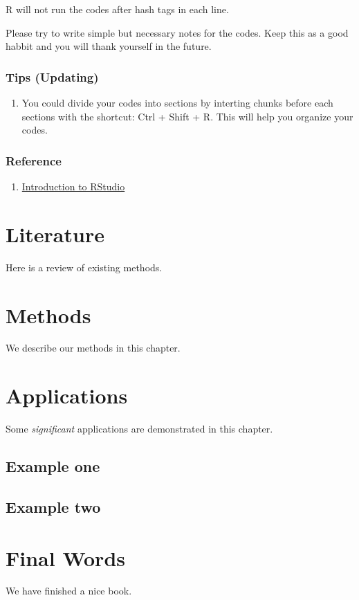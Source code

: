 \documentclass[]{book}
\providecommand{\tightlist}{%
  \setlength{\itemsep}{0pt}\setlength{\parskip}{0pt}}
\begin{document}
R will not run the codes after hash tags in each line.

Please try to write simple but necessary notes for the codes. Keep this as a good habbit and you will thank yourself in the future.

\hypertarget{tips-updating}{%
\subsection{Tips (Updating)}\label{tips-updating}}

\begin{enumerate}
\def\labelenumi{\arabic{enumi}.}
\tightlist
\item
  You could divide your codes into sections by interting chunks before each sections with the shortcut: Ctrl + Shift + R. This will help you organize your codes.
\end{enumerate}

\hypertarget{reference}{%
\subsection{Reference}\label{reference}}

\begin{enumerate}
\def\labelenumi{\arabic{enumi}.}
\tightlist
\item
  \href{https://datascienceplus.com/introduction-to-rstudio/}{Introduction to RStudio}
\end{enumerate}

\hypertarget{literature}{%
\chapter{Literature}\label{literature}}

Here is a review of existing methods.

\hypertarget{methods}{%
\chapter{Methods}\label{methods}}

We describe our methods in this chapter.

\hypertarget{applications}{%
\chapter{Applications}\label{applications}}

Some \emph{significant} applications are demonstrated in this chapter.

\hypertarget{example-one}{%
\section{Example one}\label{example-one}}

\hypertarget{example-two}{%
\section{Example two}\label{example-two}}

\hypertarget{final-words}{%
\chapter{Final Words}\label{final-words}}

We have finished a nice book.


\end{document}

